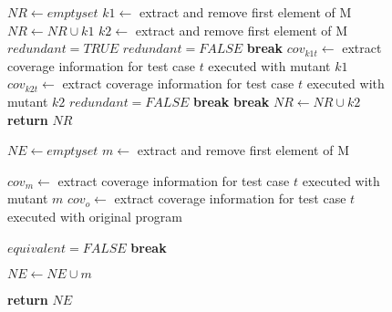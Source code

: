 \begin{figure}[tb]
\begin{algorithmic}[1]
\State $\mathit{NR} \gets \mathit{empty} \mathit{set}$
\State $\mathit{k1} \gets $ extract and remove first element of M
\State $\mathit{NR} \gets \mathit{NR} \cup \mathit{k1}$
\State $\mathit{k2} \gets $ extract and remove first element of M
\State $\mathit{redundant}=\mathit{TRUE}$
\State $\mathit{redundant}=\mathit{FALSE}$
\State \textbf{break}
\Else
\State $\mathit{cov}_{k1t} \gets $ extract coverage information for test case $t$ executed with mutant $k1$
\State $\mathit{cov}_{\mathit{k2}t} \gets $ extract coverage information for test case $t$ executed with mutant $k2$
\State $\mathit{redundant}=\mathit{FALSE}$
\State \textbf{break}
\EndIf
\EndIf
\EndFor
{}
\State \textbf{break} 
\EndIf
\EndFor
{}
\State $\mathit{NR} \gets \mathit{NR} \cup \mathit{k2}$
\EndIf
\EndWhile
\State \textbf{return} $\mathit{NR}$
\EndProcedure


\State $\mathit{NE} \gets \mathit{empty} \mathit{set}$
\State $\mathit{m} \gets $ extract and remove first element of M

\State $\mathit{cov}_{m} \gets $ extract coverage information for test case $t$ executed with mutant $m$
\State $\mathit{cov}_{o} \gets $ extract coverage information for test case $t$ executed with original program

\State $\mathit{equivalent}=\mathit{FALSE}$
\State \textbf{break}
\EndIf

\EndFor

\State $\mathit{NE} \gets \mathit{NE} \cup \mathit{m}$
\EndIf

\EndWhile

\State \textbf{return} $\mathit{NE}$
\EndProcedure




\end{algorithmic}
\end{figure}
